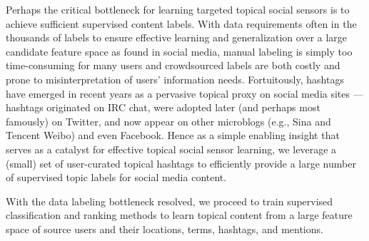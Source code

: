 

Perhaps the critical bottleneck for learning targeted topical social
sensors is to achieve sufficient supervised content labels.  With
data requirements often in the thousands of labels to ensure effective
learning and generalization over a large candidate feature space as
found in social media,
manual labeling is simply too time-consuming for many users and
crowdsourced labels are both costly and prone to misinterpretation of
users' information needs.  Fortuitously, hashtags have emerged in
recent years as a pervasive topical proxy on social media sites ---
hashtags originated on IRC chat, were adopted later (and perhaps most
famously) on Twitter, and now appear on other microblogs (e.g., Sina
and Tencent Weibo) and even Facebook.  Hence as a simple enabling
insight that serves as a catalyst for effective topical social sensor
learning, we leverage a (small) set of user-curated topical hashtags
to efficiently provide a large number of supervised topic labels for
social media content.

With the data labeling bottleneck resolved, we proceed to train
supervised classification and ranking methods to learn topical content
from a large feature space of source users and their locations, terms,
hashtags, and mentions.

